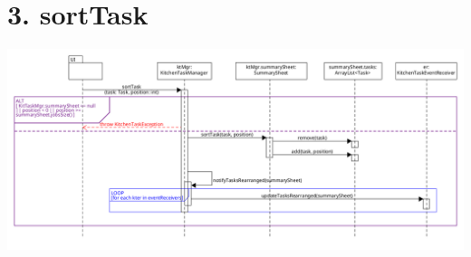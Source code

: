 \pagebreak

\section*{3. sortTask}

\begin{center}
  \includegraphics[scale = 0.35]{images/DSD/DSD 3.png}
\end{center}

\pagebreak